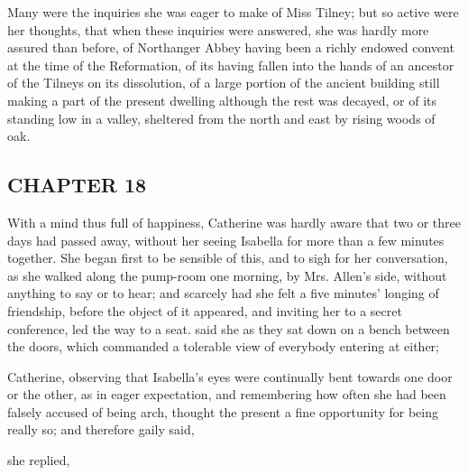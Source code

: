 Many were the inquiries she was eager to make of Miss Tilney; but so active were her thoughts, that when these inquiries were answered, she was hardly more assured than before, of Northanger Abbey having been a richly endowed convent at the time of the Reformation, of its having fallen into the hands of an ancestor of the Tilneys on its dissolution, of a large portion of the ancient building still making a part of the present dwelling although the rest was decayed, or of its standing low in a valley, sheltered from the north and east by rising woods of oak.

\subsection[chapter-18]{\useURL[url20][][][]\from[url20]CHAPTER 18}

With a mind thus full of happiness, Catherine was hardly aware that two or three days had passed away, without her seeing Isabella for more than a few minutes together. She began first to be sensible of this, and to sigh for her conversation, as she walked along the pump-room one morning, by Mrs. Allen's side, without anything to say or to hear; and scarcely had she felt a five minutes' longing of friendship, before the object of it appeared, and inviting her to a secret conference, led the way to a seat.  said she as they sat down on a bench between the doors, which commanded a tolerable view of everybody entering at either; 

Catherine, observing that Isabella's eyes were continually bent towards one door or the other, as in eager expectation, and remembering how often she had been falsely accused of being arch, thought the present a fine opportunity for being really so; and therefore gaily said, 

 she replied, 


